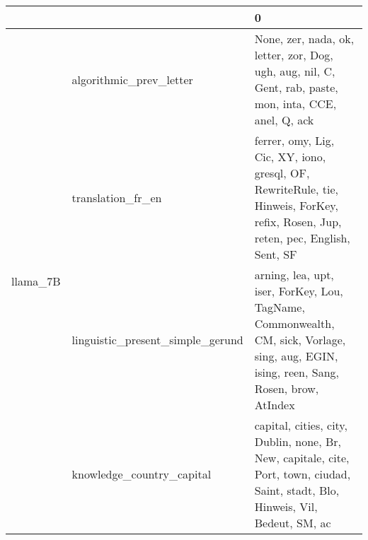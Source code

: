 \begin{tabular}{lll}
\toprule
 &  & 0 \\
\midrule
\multirow[t]{4}{*}{llama_7B} & algorithmic_prev_letter & None, zer, nada, ok, letter, zor, Dog, ugh, aug, nil, C, Gent, rab, paste, mon, inta, CCE, anel, Q, ack \\
 & translation_fr_en & ferrer, omy, Lig, Cic, XY, iono, gresql, OF, RewriteRule, tie, Hinweis, ForKey, refix, Rosen, Jup, reten, pec, English, Sent, SF \\
 & linguistic_present_simple_gerund & arning, lea, upt, iser, ForKey, Lou, TagName, Commonwealth, CM, sick, Vorlage, sing, aug, EGIN, ising, reen, Sang, Rosen, brow, AtIndex \\
 & knowledge_country_capital & capital, cities, city, Dublin, none, Br, New, capitale, cite, Port, town, ciudad, Saint, stadt, Blo, Hinweis, Vil, Bedeut, SM, ac \\
\cline{1-3}
\bottomrule
\end{tabular}
